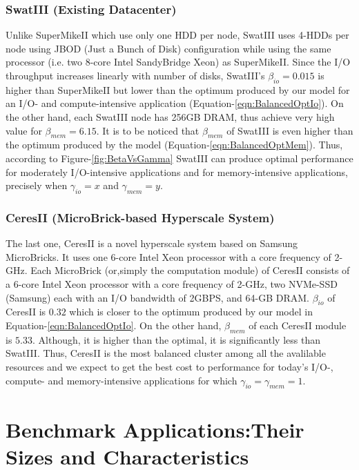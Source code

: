 \documentclass[journal]{IEEEtran}
\begin{document}
\subsubsection{SwatIII (Existing Datacenter)}
Unlike SuperMikeII which use only one HDD per node, SwatIII uses 4-HDDs per node using JBOD (Just a Bunch of Disk) conﬁguration while using the same processor (i.e. two 8-core Intel SandyBridge Xeon) as SuperMikeII. Since the I/O throughput increases linearly with number of disks, SwatIII's $\beta_{io}=0.015$ is higher than SuperMikeII but lower than the optimum produced by our model for an I/O- and compute-intensive application (Equation-\ref{eqn:BalancedOptIo}). On the other hand, each SwatIII node has 256GB DRAM, thus achieve very high value for $\beta_{mem}=6.15$. It is to be noticed that $\beta_{mem}$ of SwatIII is even higher than the optimum produced by the model (Equation-\ref{eqn:BalancedOptMem}). Thus, according to Figure-\ref{fig:BetaVsGamma} SwatIII can produce optimal performance for moderately I/O-intensive applications and for memory-intensive applications, precisely when $\gamma_{io} = x$ and $\gamma_{mem}=y$.
\subsubsection{CeresII (MicroBrick-based Hyperscale System)}
The last one, CeresII is a novel hyperscale system based on Samsung MicroBricks. It uses one 6-core Intel Xeon processor with a core frequency of 2-GHz. Each MicroBrick (or,simply the computation module) of CeresII consists of a 6-core Intel Xeon processor with a core frequency of 2-GHz, two NVMe-SSD (Samsung) each with an I/O bandwidth of 2GBPS, and 64-GB DRAM. $\beta
_{io}$ of CeresII is $0.32$ which is closer to the optimum produced by our model in Equation-\ref{eqn:BalancedOptIo}.  On the other hand, $\beta_{mem}$ of each CeresII module is $5.33$. Although, it is higher than the optimal, it is significantly less than SwatIII. Thus, CeresII is the most balanced cluster among all the avalilable resources and we expect to get the best cost to performance for today's I/O-, compute- and memory-intensive applications for which  $\gamma_{io} = \gamma_{mem} = 1$. 

\section{Benchmark Applications:Their Sizes and Characteristics} 
\end{document}
